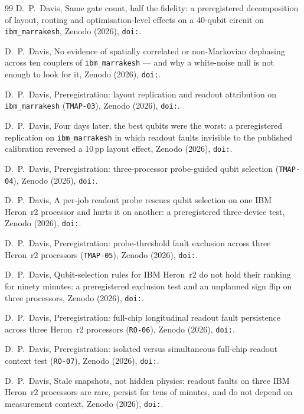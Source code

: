 \documentclass[twocolumn,aps,prapplied,superscriptaddress,floatfix]{revtex4-2}
\begin{document}
\begin{thebibliography}{99}
D.~P.~Davis, Same gate count, half the fidelity: a preregistered decomposition of layout, routing and optimisation-level effects on a 40-qubit circuit on \texttt{ibm\_marrakesh}, Zenodo (2026), \texttt{doi:\DoiTmapTwo}.

D.~P.~Davis, No evidence of spatially correlated or non-Markovian dephasing across ten couplers of \texttt{ibm\_marrakesh} --- and why a white-noise null is not enough to look for it, Zenodo (2026), \texttt{doi:\DoiCnZeroOne}.

D.~P.~Davis, Preregistration: layout replication and readout attribution on \texttt{ibm\_marrakesh} (\texttt{TMAP-03}), Zenodo (2026), \texttt{doi:\DoiTmapThreePrereg}.

D.~P.~Davis, Four days later, the best qubits were the worst: a preregistered replication on \texttt{ibm\_marrakesh} in which readout faults invisible to the published calibration reversed a 10\,pp layout effect, Zenodo (2026), \texttt{doi:\DoiTmapThree}.

D.~P.~Davis, Preregistration: three-processor probe-guided qubit selection (\texttt{TMAP-04}), Zenodo (2026), \texttt{doi:\DoiTmapFourPrereg}.

D.~P.~Davis, A per-job readout probe rescues qubit selection on one IBM Heron~r2 processor and hurts it on another: a preregistered three-device test, Zenodo (2026), \texttt{doi:\DoiTmapFour}.

D.~P.~Davis, Preregistration: probe-threshold fault exclusion across three Heron~r2 processors (\texttt{TMAP-05}), Zenodo (2026), \texttt{doi:\DoiTmapFivePrereg}.

D.~P.~Davis, Qubit-selection rules for IBM Heron~r2 do not hold their ranking for ninety minutes: a preregistered exclusion test and an unplanned sign flip on three processors, Zenodo (2026), \texttt{doi:\DoiTmapFive}.

D.~P.~Davis, Preregistration: full-chip longitudinal readout fault persistence across three Heron~r2 processors (\texttt{RO-06}), Zenodo (2026), \texttt{doi:\DoiRoSixPrereg}.

D.~P.~Davis, Preregistration: isolated versus simultaneous full-chip readout context test (\texttt{RO-07}), Zenodo (2026), \texttt{doi:\DoiRoSevenPrereg}.

D.~P.~Davis, Stale snapshots, not hidden physics: readout faults on three IBM Heron~r2 processors are rare, persist for tens of minutes, and do not depend on measurement context, Zenodo (2026), \texttt{doi:\DoiRoSixSeven}.

\end{thebibliography}
\end{document}
